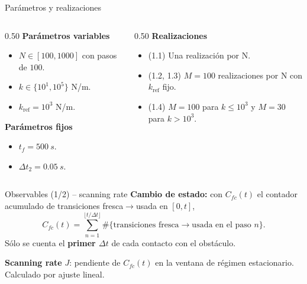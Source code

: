 \documentclass[10pt,aspectratio=169]{beamer}
\begin{document}
\begin{frame}{Parámetros y realizaciones}
    \begin{columns}[T]
        \begin{column}{0.50\textwidth}
            \textbf{Parámetros variables}
            \begin{itemize}\setlength\itemsep{2pt}
                \item $N \in [100, 1000]$ con pasos de $100$.
                \item $k \in \{10^1, 10^5\}$ \si{N/m}.
                \item $k_{\text{ref}} = 10^3$ \si{N/m}.
            \end{itemize}
            \vspace{0.2cm}
            \textbf{Parámetros fijos}
            \begin{itemize}\setlength\itemsep{2pt}
                \item $t_f = \SI{500}{s}$.
                \item $\Delta t_2 = \SI{0.05}{s}$.
            \end{itemize}
        \end{column}
        \begin{column}{0.50\textwidth}
            \textbf{Realizaciones}
            \begin{itemize}\setlength\itemsep{2pt}
                \item (1.1) Una realización por N.
                \item (1.2, 1.3) $M = 100$ realizaciones por N con $k_{\text{ref}}$ fijo.
                \item (1.4) $M=100$ para $k \leq 10^3$ y $M=30$ para $k > 10^3$.
            \end{itemize}
        \end{column}
    \end{columns}
\end{frame}

\begin{frame}{Observables (1/2) -- scanning rate}
    \textbf{Cambio de estado:} con $C_{fc}(t)$ el contador acumulado de
    transiciones fresca$\to$usada en $[0, t]$,
    \[
        C_{fc}(t) = \sum_{n=1}^{\lfloor t/\Delta t\rfloor}
                    \#\{\text{transiciones fresca}\to\text{usada en el paso } n\}.
    \]
    Sólo se cuenta el \textbf{primer $\Delta t$} de cada contacto con el obstáculo.

    \vspace{0.3cm}
    \textbf{Scanning rate} $J$: pendiente de $C_{fc}(t)$ en la ventana de régimen
    estacionario. Calculado por ajuste lineal.
\end{frame}
\end{document}
